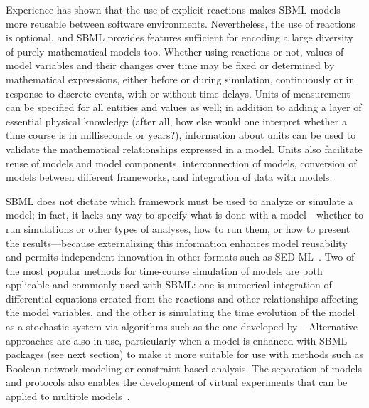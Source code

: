 \documentclass[]{draft-sbml-paper}
\begin{document}
Experience has shown that the use of explicit reactions makes SBML models more reusable between software environments.  Nevertheless, the use of reactions is optional, and SBML provides features sufficient for encoding a large diversity of purely mathematical models too.  Whether using reactions or not, values of model variables and their changes over time may be fixed or determined by mathematical expressions, either before or during simulation, continuously or in response to discrete events, with or without time delays.  Units of measurement can be specified for all entities and values as well; in addition to adding a layer of essential physical knowledge (after all, how else would one interpret whether a time course is in milliseconds or years?), information about units can be used to validate the mathematical relationships expressed in a model.  Units also facilitate reuse of models and model components, interconnection of models, conversion of models between different frameworks, and integration of data with models.

SBML does not dictate which framework must be used to analyze or simulate a model; in fact, it lacks any way to specify what is done with a model---whether to run simulations or other types of analyses, how to run them, or how to present the results---because externalizing this information enhances model reusability and permits independent innovation in other formats such as SED-ML~\citep{waltemath2011reproducible, Kohn2008sedml}. Two of the most popular methods for time-course simulation of models are both applicable and commonly used with SBML: one is numerical integration of differential equations created from the reactions and other relationships affecting the model variables, and the other is simulating the time evolution of the model as a stochastic system via algorithms such as the one developed by~\cite{gillespie1977exact}.  Alternative approaches are also in use, particularly when a model is enhanced with SBML packages (see next section) to make it more suitable for use with methods such as Boolean network modeling or constraint-based analysis.  The separation of models and protocols also enables the development of virtual experiments that can be applied to multiple models~\citep{Cooper2015call}.
\end{document}
